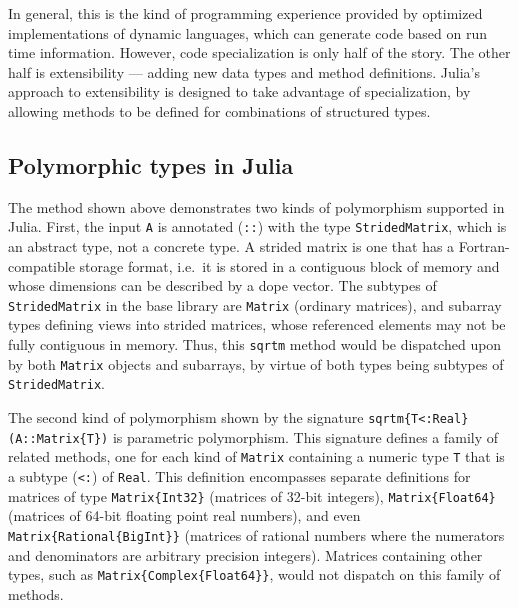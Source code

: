 In general, this is the kind of programming experience provided by
optimized implementations of dynamic languages, which can generate
code based on run time information.
However, code specialization is only half of the story.
The other half is extensibility --- adding new data types and
method definitions.
Julia's approach to extensibility is designed to take advantage of
specialization, by allowing methods to be defined for combinations
of structured types.




\subsection{Polymorphic types in Julia}

The method shown above demonstrates two kinds of polymorphism supported in
Julia. First, the input \lstinline|A| is annotated (\lstinline|::|) with the
type \lstinline|StridedMatrix|, which is an abstract type, not a concrete type.
A strided matrix is one that has a Fortran-compatible storage format, i.e.\ it
is stored in a contiguous block of memory and whose dimensions can be described
by a dope vector. The subtypes of \lstinline|StridedMatrix| in the base
library are \lstinline|Matrix| (ordinary matrices), and subarray types defining
views into strided matrices, whose referenced elements may not be fully
contiguous in memory. Thus, this \lstinline|sqrtm| method would be
dispatched upon by both \lstinline|Matrix| objects and subarrays, by virtue of
both types being subtypes of \lstinline|StridedMatrix|.

The second kind of polymorphism shown by the signature
\lstinline|sqrtm{T<:Real}(A::Matrix{T})| is parametric polymorphism. This
signature defines a family of related methods, one for each kind of
\lstinline|Matrix| containing a numeric type \lstinline|T| that is a subtype
(\lstinline|<:|) of \lstinline|Real|. This definition encompasses separate
definitions for matrices of type \lstinline|Matrix{Int32}| (matrices of 32-bit
integers), \lstinline|Matrix{Float64}| (matrices of 64-bit floating point real
numbers), and even \lstinline|Matrix{Rational{BigInt}}| (matrices of rational
numbers where the numerators and denominators are arbitrary precision
integers). Matrices containing other types, such as
\lstinline|Matrix{Complex{Float64}}|, would not dispatch on this family of methods.

